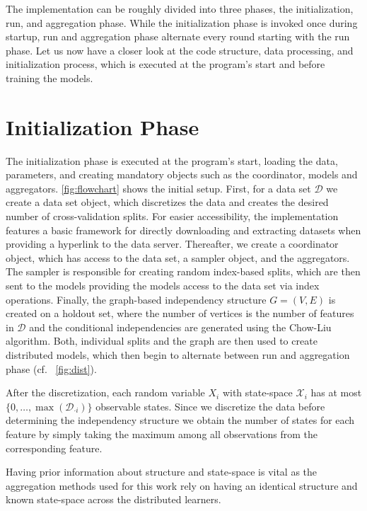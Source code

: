 The implementation can be roughly divided into three phases, the initialization, run, and aggregation phase.
While the initialization phase is invoked once during startup, run and aggregation phase alternate every round starting with the run phase.
Let us now have a closer look at the code structure, data processing, and initialization process, which is executed at the program's start and before training the models. 

\section{Initialization Phase}

The initialization phase is executed at the program's start, loading the data, parameters, and creating mandatory objects such as the coordinator, models and aggregators.
\fig \ref{fig:flowchart} shows the initial setup.
First, for a data set $\mathcal{D}$ we create a data set object, which discretizes the data and creates the desired number of cross-validation splits. 
For easier accessibility, the implementation features a basic framework for directly downloading and extracting datasets when providing a hyperlink to the data server.
Thereafter, we create a coordinator object, which has access to the data set, a sampler object, and the aggregators.
The sampler is responsible for creating random index-based splits, which are then sent to the models providing the models access to the data set via index operations.
Finally, the graph-based independency structure $G=(V,E)$ is created on a holdout set, where the number of vertices is the number of features in $\mathcal{D}$ and the conditional independencies are generated using the Chow-Liu algorithm.
Both, individual splits and the graph are then used to create distributed models, which then begin to alternate between run and aggregation phase (cf. \fig~\ref{fig:dist}).

After the discretization, each random variable $X_i$ with state-space $\mathcal{X}_i$ has at most $\{0, \ldots, \max(\mathcal{D}_{\cdot i})\}$ observable states.
Since we discretize the data before determining the independency structure we obtain the number of states for each feature by simply taking the maximum among all observations from the corresponding feature. 

Having prior information about structure and state-space is vital as the aggregation methods used for this work rely on having an identical structure and known state-space across the distributed learners.

